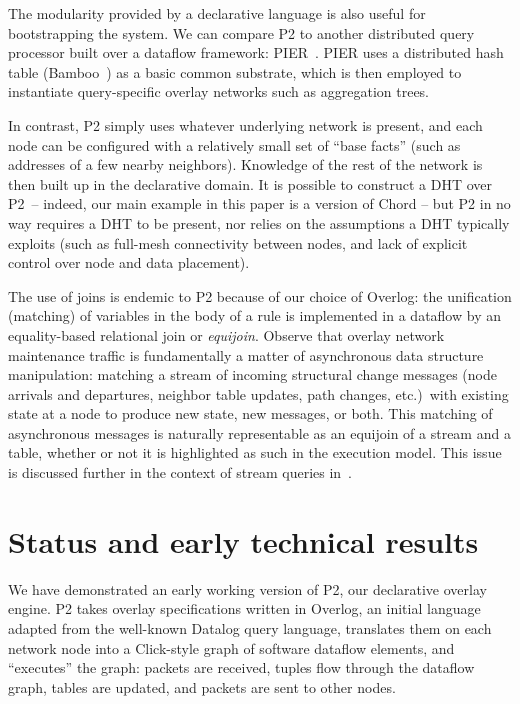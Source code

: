 \documentclass[twocolumn,10pt]{article}
\def\Sys{P2\xspace}
\def\Lang{Overlog\xspace}
\begin{document}
The modularity provided by a declarative language is also useful
for bootstrapping the system.   We can compare \Sys to another
distributed query processor built over a dataflow framework:
PIER~\cite{pier-cidr}.  PIER uses a distributed hash table
(Bamboo~\cite{rhea_usenix_2004}) as a basic common substrate, which is
then employed to instantiate query-specific overlay networks such as 
aggregation trees.  

In contrast, \Sys simply uses whatever underlying
network is present, and each node can be configured with a relatively
small set of ``base facts'' (such as addresses of a few nearby
neighbors).  Knowledge of the rest of the network is then built up in
the declarative domain.  It is possible to construct a DHT over \Sys~--
indeed, our main example in this paper is a version of Chord -- but \Sys
in no way requires a DHT to be present, nor relies on the assumptions
a DHT typically exploits (such as full-mesh connectivity between
nodes, and lack of explicit control over node and data placement).  

The use of joins is endemic to
\Sys because of our choice of \Lang: the unification (matching) of
variables in the body of a rule is implemented in a dataflow by an
equality-based relational join or \textit{equijoin}.
Observe that overlay network maintenance traffic
is fundamentally a matter of asynchronous data structure manipulation:
matching a stream of incoming structural 
change messages (node arrivals and departures, neighbor table updates,
path changes, etc.)~with existing state at a node to produce new
state, new messages, or both. This matching of asynchronous messages is
naturally representable as an equijoin of a stream and a table, whether or
not it is highlighted as such in the execution model.  This issue is
discussed further in the context of stream queries
in~\cite{shankar-stems}. 

\section{Status and early technical results}
\label{sec:early}

We have demonstrated an early working version of \Sys, our declarative
overlay engine. P2 takes overlay specifications written in Overlog,
an initial language adapted from the well-known Datalog query
language, translates them on each network node into a Click-style
graph of software dataflow elements, and ``executes'' the graph:
packets are received, tuples flow through the dataflow graph, tables
are updated, and packets are sent to other nodes.
\end{document}
